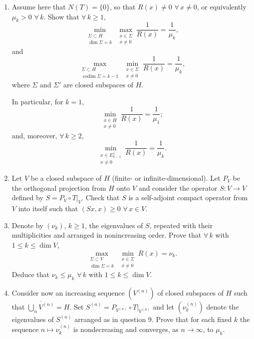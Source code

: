 \documentclass[12pt]{article}
\begin{document}
\begin{enumerate}
\item Assume here that $N(T) = \{0\}$, so that $R(x) \neq 0$ $\forall\, x \neq 0$, or equivalently
$\mu_k > 0$ $\forall\, k$. Show that $\forall\, k \ge 1$,
\[
\min_{\substack{\Sigma \subset H \\ \dim\Sigma = k}} \max_{\substack{x \in \Sigma \\ x \neq 0}} \frac{1}{R(x)} = \frac{1}{\mu_k},
\]
and
\[
\max_{\substack{\Sigma \subset H \\ \operatorname{codim}\Sigma = k-1}} \min_{\substack{x \in \Sigma \\ x \neq 0}} \frac{1}{R(x)} = \frac{1}{\mu_k},
\]
where $\Sigma$ and $\Sigma'$ are closed subspaces of $H$.
 
In particular, for $k = 1$,
\[
\min_{\substack{x \in H \\ x \neq 0}} \frac{1}{R(x)} = \frac{1}{\mu_1};
\]
and, moreover, $\forall\, k \ge 2$,
\[
\min_{\substack{x \in E_{k-1}^\perp \\ x \neq 0}} \frac{1}{R(x)} = \frac{1}{\mu_k}.
\]
 
\item Let $V$ be a closed subspace of $H$ (finite- or infinite-dimensional). Let $P_V$ be
the orthogonal projection from $H$ onto $V$ and consider the operator $S : V \to V$
defined by $S = P_V \circ T|_V$. Check that $S$ is a self-adjoint compact operator
from $V$ into itself such that $(Sx,x) \ge 0$ $\forall\, x \in V$.
 
\item Denote by $(\nu_k)$, $k \ge 1$, the eigenvalues of $S$, repeated with their multiplicities
and arranged in nonincreasing order. Prove that $\forall\, k$ with $1 \le k \le \dim V$,
\[
\max_{\substack{\Sigma \subset V \\ \dim\Sigma = k}} \min_{\substack{x \in \Sigma \\ x \neq 0}} R(x) = \nu_k.
\]
Deduce that $\nu_k \le \mu_k$ $\forall\, k$ with $1 \le k \le \dim V$.
 
\item Consider now an increasing sequence $(V^{(n)})$ of closed subspaces of $H$ such that
$\overline{\bigcup_n V^{(n)}} = H$.
Set $S^{(n)} = P_{V^{(n)}} \circ T|_{V^{(n)}}$ and let $(\nu_k^{(n)})$ denote the eigenvalues of $S^{(n)}$
arranged as in question 9. Prove that for each fixed $k$ the sequence $n \mapsto \nu_k^{(n)}$
is nondecreasing and converges, as $n \to \infty$, to $\mu_k$.
\end{enumerate}
 
\bigskip
 
\end{document}
